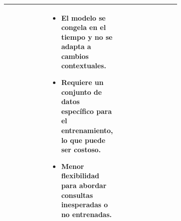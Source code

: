 \begin{table}[ht]
\begin{tabular}{|c|p{0.35\linewidth}|p{0.35\linewidth}|}
\begin{raggedright}
        \end{raggedright} & 
        \begin{raggedright}
        \begin{itemize}
            \item El modelo se congela en el tiempo y no se adapta a cambios contextuales.
            \item Requiere un conjunto de datos específico para el entrenamiento, lo que puede ser costoso.
            \item Menor flexibilidad para abordar consultas inesperadas o no entrenadas.
        \end{itemize} 
        \end{raggedright} \\
        \hline
    \end{tabular}
    \label{tab:rag_vs_finetuning}
\end{table}

 